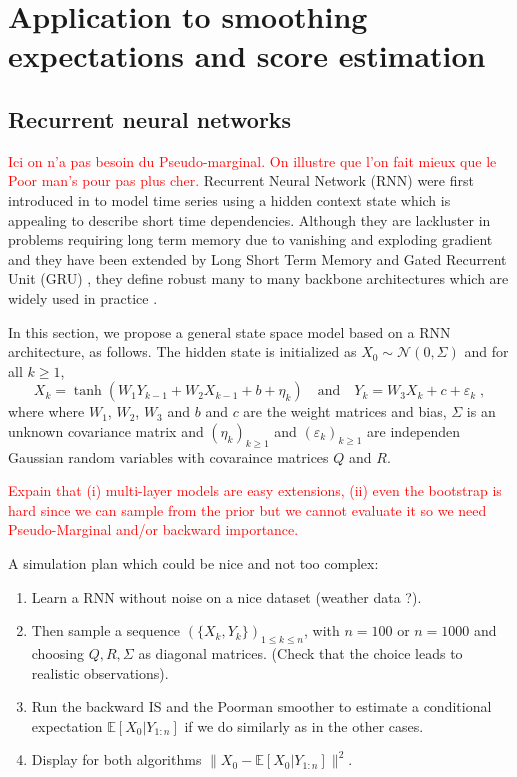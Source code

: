\documentclass{article}
\newcommand{\eqsp}{\;}
\begin{document}
\section{Application to smoothing expectations and score estimation}

\subsection{Recurrent neural networks}
\textcolor{red}{Ici on n'a pas besoin du Pseudo-marginal. On illustre que l'on fait mieux que le Poor man's pour pas plus cher.}
Recurrent Neural Network (RNN) were first introduced in \cite{Mozer1989AFB} to model time series using a hidden context state  which is appealing to describe short time dependencies. Although they are lackluster in problems requiring long term memory due to vanishing and exploding gradient \cite{Bengio1994LearningLD} and they have been extended by Long Short Term Memory  \cite{Hochreiter1997LongSM} and Gated Recurrent Unit (GRU) \cite{Cho2014LearningPR}, they define robust many to many backbone architectures which are widely used in practice \cite{}.


In this section, we propose a general state space model based on a RNN architecture, as follows.  The hidden state is initialized as $X_0 \sim \mathcal{N}(0,\Sigma)$ and for all $k\geqslant 1$,
$$
X_k = \tanh(W_{1} Y_{k-1} + W_{2} X_{k-1} + b + \eta_k)\quad\mathrm{and} \quad Y_k = W_{3} X_{k}  + c + \varepsilon_k\eqsp,
$$
where where $W_{1}$, $W_{2}$, $W_3$ and $b$ and $c$ are the weight matrices and bias,  $\Sigma$ is an unknown covariance matrix and $(\eta_k)_{k\geqslant 1}$ and $(\varepsilon_k)_{k\geqslant 1}$ are independen Gaussian random variables with covaraince matrices $Q$ and $R$.

\textcolor{red}{Expain that (i) multi-layer models  are easy extensions, (ii) even the bootstrap is hard since we can sample from the prior but we cannot evaluate it so we need Pseudo-Marginal and/or backward importance.}

A simulation plan which could be nice and not too complex:
\begin{enumerate}
\item Learn a RNN without noise on a nice dataset (weather data ?).
\item Then sample a sequence $(\{X_k,Y_k\})_{1\leqslant k\leqslant n}$, with $n=100$ or $n=1000$ and choosing $Q,R,\Sigma$ as diagonal matrices. (Check that the choice leads to realistic observations).
\item Run the backward IS and the Poorman smoother to estimate a conditional expectation $\mathbb{E}[X_0|Y_{1:n}]$ if we do similarly as in the other cases.
\item Display for both algorithms $\|X_0 - \mathbb{E}[X_0|Y_{1:n}]\|^2$.
\end{enumerate}
\end{document}
